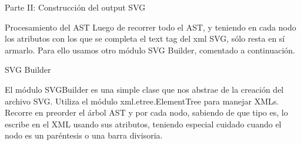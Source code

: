 \begin{section}{Parte II: Construcci\'on del output SVG}
\begin{subsection}{Procesamiento del AST}
Luego de recorrer todo el AST, y teniendo en cada nodo los atributos con los que se completa el text tag del xml SVG, s\'olo resta en s\'i armarlo. Para ello usamos otro m\'odulo SVG Builder, comentado a continuaci\'on.

\end{subsection}

\begin{subsection}{SVG Builder}

El m\'odulo SVGBuilder es una simple clase que nos abstrae de la creaci\'on del archivo SVG. Utiliza el m\'odulo xml.etree.ElementTree para manejar XMLs.
Recorre en preorder el \'arbol AST y por cada nodo, sabiendo de que tipo es, lo escribe en el XML usando sus atributos, teniendo especial cuidado cuando el nodo es un par\'entesis o una barra divisoria.

\end{subsection}

\end{section}

